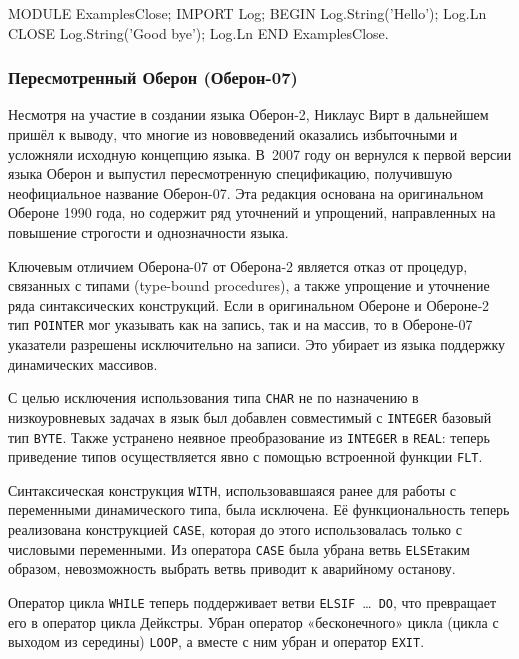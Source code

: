 \documentclass[utf8]{lgu}
\newcommand{\captionlisting}[1]{%
  \captionsetup{type=listing}%
  \captionof{listing}{#1}%
  \vspace{-11pt}%
}
\newcommand{\tire}{\unskip\nobreak\thinspace\textemdash\thinspace}
\newcommand{\code}[1]{{\normalsize\texttt{#1}}}
\begin{document}
\vspace{1.3\baselineskip}
\captionsetup{type=listing}
\captionlisting{Секция CLOSE в Компонентном Паскале}
\label{lst:ComponentPascalClose}
\begin{modula2long}
MODULE ExamplesClose;
IMPORT Log;
BEGIN
  Log.String('Hello'); Log.Ln
CLOSE
  Log.String('Good bye'); Log.Ln
END ExamplesClose.
\end{modula2long}

\subsubsection{Пересмотренный Оберон (Оберон-07)}

\label{sec:Oberon07}

\firstparskip Несмотря на участие в создании языка Оберон‑2, Никлаус Вирт в дальнейшем пришёл к выводу, что многие из нововведений оказались избыточными и усложняли исходную концепцию языка. В~2007 году он вернулся к первой версии языка Оберон и выпустил пересмотренную спецификацию, получившую неофициальное название Оберон-07. Эта редакция основана на оригинальном Обероне 1990 года, но содержит ряд уточнений и упрощений, направленных на повышение строгости и однозначности языка.

Ключевым отличием Оберона-07 от Оберона‑2 является отказ от процедур, связанных с типами (type-bound procedures), а также упрощение и уточнение ряда синтаксических конструкций. Если в оригинальном Обероне и Обероне‑2 тип \code{POINTER} мог указывать как на запись, так и на массив, то в Обероне-07 указатели разрешены исключительно на записи. Это убирает из языка поддержку динамических массивов.

С целью исключения использования типа \code{CHAR} не по назначению в низкоуровневых задачах в язык был добавлен совместимый с \code{INTEGER} базовый тип \code{BYTE}. Также устранено неявное преобразование из \code{INTEGER} в \code{REAL}: теперь приведение типов осуществляется явно с помощью встроенной функции \code{FLT}.

Синтаксическая конструкция \code{WITH}, использовавшаяся ранее для работы с переменными динамического типа, была исключена. Её функциональность теперь реализована конструкцией \code{CASE}, которая до этого использовалась только с числовыми переменными. Из оператора \code{CASE} была убрана ветвь \code{ELSE}\tire таким образом, невозможность выбрать ветвь приводит к аварийному останову.

Оператор цикла \code{WHILE} теперь поддерживает ветви \code{ELSIF}~\ldots~\code{DO}, что превращает его в оператор цикла Дейкстры. Убран оператор «бесконечного» цикла (цикла с выходом из середины) \code{LOOP}, а вместе с ним убран и оператор \code{EXIT}.
\end{document}
